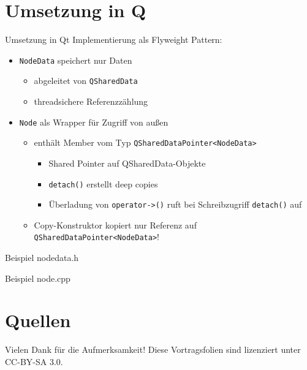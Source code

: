 \documentclass{beamer}
\begin{document}
\section{Umsetzung in Q}
\begin{frame}{Umsetzung in Qt}
  Implementierung als Flyweight Pattern:
  \begin{itemize}
    \item \texttt{NodeData} speichert nur Daten
      \begin{itemize}
        \item abgeleitet von \texttt{QSharedData}
        \item threadsichere Referenzzählung
      \end{itemize}
    \pause
    \item \texttt{Node} als Wrapper für Zugriff von außen
      \begin{itemize}
        \item enthält Member vom Typ \texttt{QSharedDataPointer<NodeData>}
          \begin{itemize}
            \item Shared Pointer auf QSharedData-Objekte
            \item \texttt{detach()} erstellt deep copies
            \item Überladung von \texttt{operator->()}
              ruft bei Schreibzugriff \texttt{detach()} auf
          \end{itemize}
        \item Copy-Konstruktor kopiert nur Referenz auf
          \texttt{QSharedDataPointer<NodeData>}!
      \end{itemize}
  \end{itemize}
\end{frame}

\begin{frame}{Beispiel}
  nodedata.h
  
\end{frame}

\begin{frame}{Beispiel}
  node.cpp
  
\end{frame}

\section{Quellen}
\begin{frame}
  \centering
  \vfill
  Vielen Dank für die Aufmerksamkeit!
  \vfill
  {\footnotesize Diese Vortragsfolien sind lizenziert unter CC-BY-SA 3.0.}
  \vfill
  \begin{thebibliography}{9}
  \end{thebibliography}
\end{frame}
\end{document}
